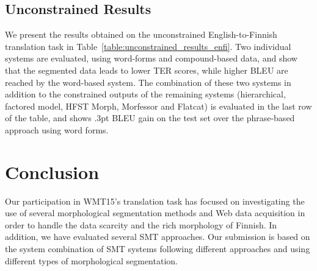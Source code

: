 \documentclass[postprint]{flammie}
\begin{document}
\subsection{Unconstrained Results}
\label{section:constrained_results_fien}
%

We present the results obtained on the unconstrained English-to-Finnish translation task in Table~\ref{table:unconstrained_results_enfi}. Two individual systems are evaluated, using word-forms and compound-based data, and show that the segmented data leads to lower TER scores, while higher BLEU are reached by the word-based system.
The combination of these two systems in addition to the constrained outputs of the remaining systems (hierarchical, factored model, HFST Morph, Morfessor and Flatcat) is evaluated in the last row of the table, and shows $.3$pt BLEU gain on the test set over the phrase-based approach using word forms.
%

\begin{table}
\end{table}
%
\section{Conclusion}
\label{section:conclusion}
%
Our participation in WMT15's translation task has focused on investigating the use of several morphological segmentation methods and Web data acquisition in order to handle the data scarcity and the rich morphology of Finnish. In addition, we have evaluated several SMT approaches.
Our submission is based on the system combination of SMT systems following different approaches and using different types of morphological segmentation.
%
\end{document}
